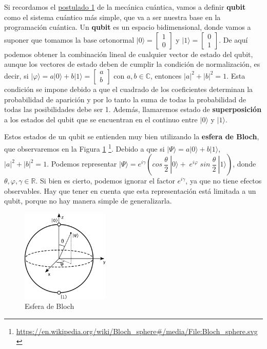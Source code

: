  Si recordamos el \hyperref[Postulado1]{postulado 1} de la mecánica cuántica, vamos a definir \textbf{qubit} como el sistema cuántico más simple, que va a ser nuestra base en la programación cuántica. Un \textbf{qubit} es un espacio bidimensional, donde vamos a suponer que tomamos la base ortonormal $|0 \rangle = \begin{bmatrix} 1\\0 \end{bmatrix}$ y $|1 \rangle = \begin{bmatrix} 0\\1 \end{bmatrix}$. De aquí podemos obtener la combinación lineal de cualquier vector de estado del qubit, aunque los vectores de estado deben de cumplir la condición de normalización, es decir, si $|\varphi \rangle = a |0\rangle + b |1\rangle = \begin{bmatrix} a\\b \end{bmatrix}$ con $a,b \in \mathbb{C}$, entonces $|a|^{2}+|b|^{2}=1$. Esta condición se impone debido a que el cuadrado de los coeficientes determinan la probabilidad de aparición y por lo tanto la suma de todas la probabilidad de todas las posibilidades debe ser 1. Además, llamaremos estado de \textbf{superposición} a los estados del qubit que se encuentran en el continuo entre $|0\rangle$ y $|1\rangle$.\newline

 Estos estados de un qubit se entienden muy bien utilizando la \textbf{esfera de Bloch}, que observaremos en la Figura \ref{Fig:Bloch} \footnote{\url{https://en.wikipedia.org/wiki/Bloch\_sphere\#/media/File:Bloch\_sphere.svg}}. Debido a que si $|\Psi \rangle = a |0\rangle + b |1\rangle$, $|a|^{2}+|b|^{2}=1$. Podemos representar $|\Psi \rangle = e^{i\gamma}\left( cos\:\dfrac{\theta}{2} \:|0\rangle +\; e^{i\varphi}\;sin\:\dfrac{\theta}{2}\:|1\rangle\right)$, donde $\theta,\varphi,\gamma \in \mathbb{R}$. Si bien es cierto, podemos ignorar el factor $e^{i\gamma}$, ya que no tiene efectos observables. Hay que tener en cuenta que esta representación está limitada a un qubit, porque no hay manera simple de generalizarla.

  \begin{figure}[H]
    \centering
    \includegraphics[width=0.37\textwidth]{TFG/imagenes/Bloch_sphere.png}
    \caption{Esfera de Bloch} 
    \label{Fig:Bloch}
  \end{figure}
 
